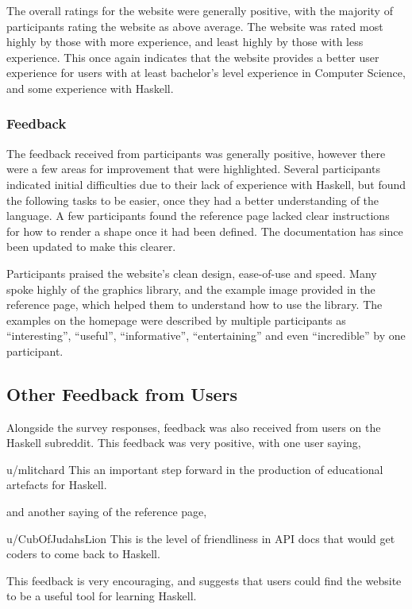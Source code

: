 \documentclass[../main.tex]{subfiles}
\begin{document}
                The overall ratings for the website were generally positive, with the majority
                    of participants rating the website as above average.
                The website was rated most highly by those with more experience, and least
                    highly by those with less experience.
                This once again indicates that the website provides a better user experience
                    for users with at least bachelor's level experience in Computer Science, and
                    some experience with Haskell.

            \subsubsection{Feedback}
                The feedback received from participants was generally positive, however there
                    were a few areas for improvement that were highlighted.
                Several participants indicated initial difficulties due to their lack of
                    experience with Haskell, but found the following tasks to be easier, once they
                    had a better understanding of the language.
                A few participants found the reference page lacked clear instructions for how
                    to render a shape once it had been defined.
                The documentation has since been updated to make this clearer.

                Participants praised the website's clean design, ease-of-use and speed.
                Many spoke highly of the graphics library, and the example image provided in
                    the reference page, which helped them to understand how to use the library.
                The examples on the homepage were described by multiple participants as
                    ``interesting'', ``useful'', ``informative'', ``entertaining'' and even
                    ``incredible'' by one participant.

        \subsection{Other Feedback from Users}

            Alongside the survey responses, feedback was also received from users on the
                Haskell subreddit.
            This feedback was very positive, with one user saying,
            \begin{aquote}{u/mlitchard}
                This an important step forward in the production of educational artefacts for
                    Haskell.
            \end{aquote}
            and another saying of the reference page,
            \begin{aquote}{u/CubOfJudahsLion}
                This is the level of friendliness in API docs that would get coders to come
                    back to Haskell.
            \end{aquote}
            This feedback is very encouraging, and suggests that users could find the
                website to be a useful tool for learning Haskell.
\end{document}
